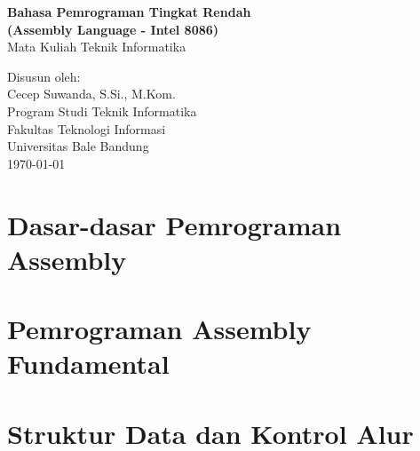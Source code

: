 \documentclass[a4paper,12pt]{book}
\begin{document}
\begin{titlepage}
\begin{center}
\vspace*{2cm}
{\Huge\bfseries Bahasa Pemrograman Tingkat Rendah}\\[0.5cm]
{\Large\bfseries (Assembly Language - Intel 8086)}\\[1cm]
{\large Mata Kuliah Teknik Informatika}\\[2cm]

\vfill

{\large Disusun oleh:}\\
{\large Cecep Suwanda, S.Si., M.Kom.}\\[1cm]

{\large Program Studi Teknik Informatika}\\
{\large Fakultas Teknologi Informasi}\\
{\large Universitas Bale Bandung}\\[1cm]

{\large \today}
\end{center}
\end{titlepage}

\tableofcontents
\newpage

\part{Dasar-dasar Pemrograman Assembly}\label{part:basics}





\part{Pemrograman Assembly Fundamental}\label{part:fundamental}







\part{Struktur Data dan Kontrol Alur}\label{part:structures}




\end{document}
